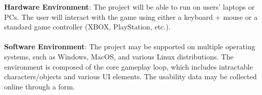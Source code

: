 \textbf{Hardware Environment}:
The project will be able to run on users' laptops or PCs. The user will interact with the game using either a keyboard + mouse or a standard game controller (XBOX, PlayStation, etc.).
\\
\\
\textbf{Software Environment}:
The project may be supported on multiple operating systems, such as Windows, MacOS, and various Linux distributions. The environment is composed of the core gameplay loop, which includes intractable characters/objects and various UI elements. The usability data may be collected online through a form.
